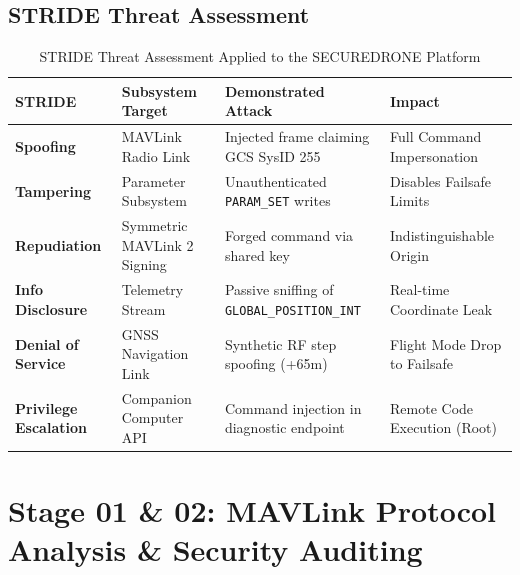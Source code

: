 \documentclass[11pt,a4paper]{article}
\begin{document}
\subsection{STRIDE Threat Assessment}
\begin{table}[htbp]
    \centering
    \small
    \begin{tabular}{lp{4.2cm}p{4.2cm}l}
        \toprule
        \textbf{STRIDE} & \textbf{Subsystem Target} & \textbf{Demonstrated Attack} & \textbf{Impact} \\
        \midrule
        \textbf{Spoofing} & MAVLink Radio Link & Injected frame claiming GCS SysID 255 & Full Command Impersonation \\
        \textbf{Tampering} & Parameter Subsystem & Unauthenticated \texttt{PARAM\_SET} writes & Disables Failsafe Limits \\
        \textbf{Repudiation} & Symmetric MAVLink 2 Signing & Forged command via shared key & Indistinguishable Origin \\
        \textbf{Info Disclosure} & Telemetry Stream & Passive sniffing of \texttt{GLOBAL\_POSITION\_INT} & Real-time Coordinate Leak \\
        \textbf{Denial of Service} & GNSS Navigation Link & Synthetic RF step spoofing (+65m) & Flight Mode Drop to Failsafe \\
        \textbf{Privilege Escalation} & Companion Computer API & Command injection in diagnostic endpoint & Remote Code Execution (Root) \\
        \bottomrule
    \end{tabular}
    \caption{STRIDE Threat Assessment Applied to the SECUREDRONE Platform}
    \label{tab:stride}
\end{table}

\section{Stage 01 \& 02: MAVLink Protocol Analysis \& Security Auditing}
\end{document}

